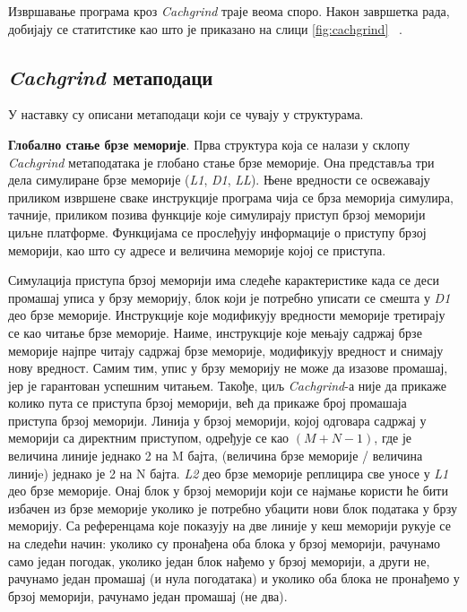 \documentclass[12pt,oneside]{memoir}
\begin{document}
\indent Извршавање програма кроз \textit{Cachgrind} траје веома споро. Након завршетка рада, добијају се статитстике као што је приказано на слици \ref{fig:cachgrind} ~\cite{cachegrindRef}.

\subsection{\textit{Cachgrind} метаподаци}

\indent У наставку су описани метаподаци који се чувају у структурама.

\indent \textbf{Глобално стање брзе меморије}. Прва структура која се налази у склопу \textit{Cachgrind} метаподатака је глобано стање брзе меморије. Она представља три дела симулиране брзе меморије (\textit{L1}, \textit{D1},  \textit{LL}). Њене вредности се освежавају приликом извршене сваке инструкције програма чија се брза меморија симулира, тачније, приликом позива функције које симулирају приступ брзој меморији циљне платформе. Функцијама се прослеђују информације о приступу брзој меморији, као што су адресе и величина меморије којој се приступа.

\indent Симулација приступа брзој меморији има следеће карактеристике када се деси промашај уписа у брзу меморију, блок који је потребно уписати се смешта у \textit{D1} део брзе меморије. Инструкције које модификују вредности меморије третирају се као читање брзе меморије. Наиме, инструкције које мењају садржај брзе меморије најпре читају садржај брзе меморије, модификују вредност и снимају нову вредност. Самим тим, упис у брзу меморију не може да изазове промашај, јер је гарантован успешним читањем. Такође, циљ \textit{Cachgrind}-а није да прикаже колико пута се приступа брзој меморији, већ да прикаже број промашаја приступа брзој меморији. Линија у брзој меморији, којој одговара садржај у меморији са директним приступом, одређује се као $(M + N - 1)$, где је величина линије једнако 2 на M бајта, (величина брзе меморије / величина линијe) једнако је 2 на N бајта. \textit{L2} део брзе меморије реплицира све уносе у \textit{L1} део брзе меморије. Онај блок у брзој меморији који се најмање користи ће бити избачен из брзе меморије уколико је потребно убацити нови блок података у брзу меморију. Са референцама које показују на две линије у кеш меморији рукује се на следећи начин: уколико су пронађена оба блока у брзој меморији, рачунамо само један погодак, уколико један блок нађемо у брзој меморији, а други не, рачунамо један промашај (и нула погодатака) и уколико оба блока не пронађемо у брзој меморији, рачунамо један промашај (не два).
\end{document}
